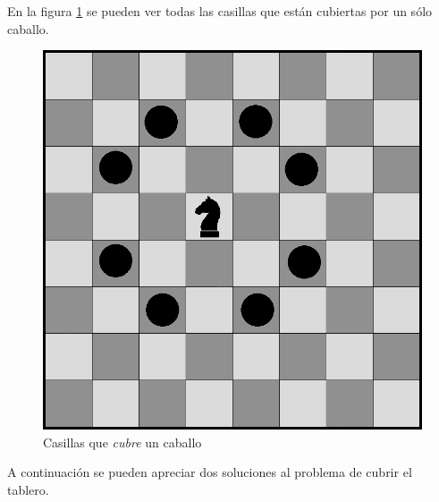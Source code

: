 \documentclass[a4paper]{article}
\begin{document}
En la figura \ref{caballito} se pueden ver todas las casillas que est\'an cubiertas por un s\'olo caballo.


 \begin{figure}[h!]
   \begin{center}
 	\includegraphics[scale=0.3]{imagenes/ej3/caballito.png}
 	\caption{Casillas que \emph{cubre} un caballo}
 	\label{caballito}	
   \end{center}
 \end{figure}


A continuaci\'on se pueden apreciar dos soluciones al problema de cubrir el tablero.
\end{document}
